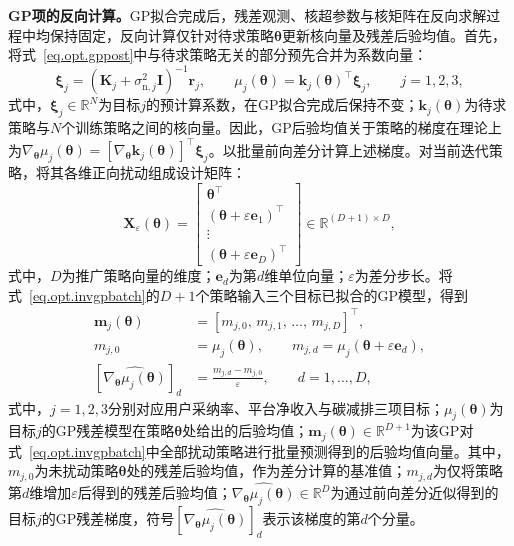 \textbf{GP项的反向计算。}GP拟合完成后，残差观测、核超参数与核矩阵在反向求解过程中均保持固定，反向计算仅针对待求策略$\bm{\theta}$更新核向量及残差后验均值。首先，将式~\eqref{eq.opt.gppost}中与待求策略无关的部分预先合并为系数向量：
\begin{equation}
\bm{\xi}_{j}=\left(\bm{K}_{j}+\sigma_{\mathrm{n},j}^{2}\bm{I}\right)^{-1}\bm{r}_{j},\qquad
\mu_{j}\left(\bm{\theta}\right)=\bm{k}_{j}\left(\bm{\theta}\right)^{\top}\bm{\xi}_{j},\qquad j=1,2,3,
\label{eq.opt.invgpcoef}
\end{equation}
式中，$\bm{\xi}_{j}\in\mathbb{R}^{N}$为目标$j$的预计算系数，在GP拟合完成后保持不变；$\bm{k}_{j}\left(\bm{\theta}\right)$为待求策略与$N$个训练策略之间的核向量。因此，GP后验均值关于策略的梯度在理论上为$\nabla_{\bm{\theta}}\mu_{j}\left(\bm{\theta}\right)=\left[\nabla_{\bm{\theta}}\bm{k}_{j}\left(\bm{\theta}\right)\right]^{\top}\bm{\xi}_{j}$。以批量前向差分计算上述梯度。对当前迭代策略，将其各维正向扰动组成设计矩阵：
\begin{equation}
\bm{X}_{\varepsilon}\left(\bm{\theta}\right)=
\begin{bmatrix}
\bm{\theta}^{\top}\\
\left(\bm{\theta}+\varepsilon\bm{e}_{1}\right)^{\top}\\
\vdots\\
\left(\bm{\theta}+\varepsilon\bm{e}_{D}\right)^{\top}
\end{bmatrix}
\in\mathbb{R}^{\left(D+1\right)\times D},
\label{eq.opt.invgpbatch}
\end{equation}
式中，$D$为推广策略向量的维度；$\bm{e}_{d}$为第$d$维单位向量；$\varepsilon$为差分步长。将式~\eqref{eq.opt.invgpbatch}的$D+1$个策略输入三个目标已拟合的GP模型，得到
\begin{equation}
\begin{aligned}
\bm{m}_{j}\left(\bm{\theta}\right)
&=\left[m_{j,0},\,m_{j,1},\,\ldots,\,m_{j,D}\right]^{\top},\\
m_{j,0}&=\mu_{j}\left(\bm{\theta}\right),\qquad
m_{j,d}=\mu_{j}\left(\bm{\theta}+\varepsilon\bm{e}_{d}\right),\\
\left[\widehat{\nabla_{\bm{\theta}}\mu_{j}\left(\bm{\theta}\right)}\right]_{d}
&=\frac{m_{j,d}-m_{j,0}}{\varepsilon},\qquad d=1,\ldots,D,
\end{aligned}
\label{eq.opt.invgpgrad}
\end{equation}
式中，$j=1,2,3$分别对应用户采纳率、平台净收入与碳减排三项目标；$\mu_j(\bm{\theta})$为目标$j$的GP残差模型在策略$\bm{\theta}$处给出的后验均值；$\bm{m}_j(\bm{\theta})\in\mathbb{R}^{D+1}$为该GP对式~\eqref{eq.opt.invgpbatch}中全部扰动策略进行批量预测得到的后验均值向量。其中，$m_{j,0}$为未扰动策略$\bm{\theta}$处的残差后验均值，作为差分计算的基准值；$m_{j,d}$为仅将策略第$d$维增加$\varepsilon$后得到的残差后验均值；$\widehat{\nabla_{\bm{\theta}}\mu_j(\bm{\theta})}\in\mathbb{R}^{D}$为通过前向差分近似得到的目标$j$的GP残差梯度，符号$\left[\widehat{\nabla_{\bm{\theta}}\mu_j(\bm{\theta})}\right]_{d}$表示该梯度的第$d$个分量。

